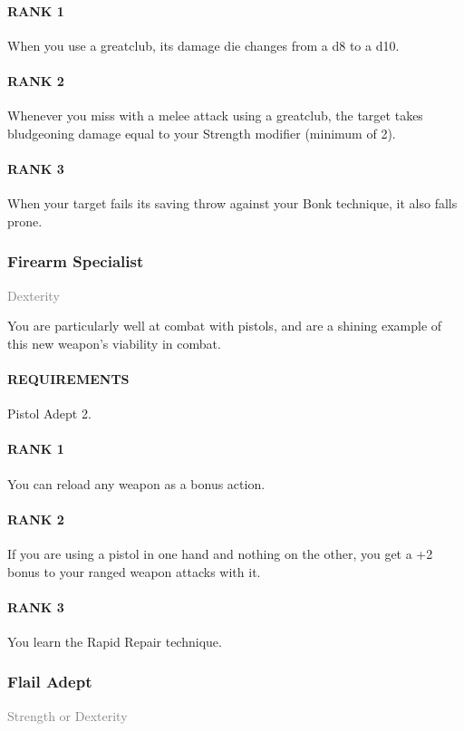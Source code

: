 \paragraph{RANK 1} When you use a greatclub, its damage die changes from a d8 to a d10.
\paragraph{RANK 2} Whenever you miss with a melee attack using a greatclub, the target takes bludgeoning damage equal to your Strength modifier (minimum of 2).
\paragraph{RANK 3} When your target fails its saving throw against your Bonk technique, it also falls prone.

\subsubsection{Firearm Specialist} \label{feat::firearmspecialist}
\small{\textcolor{gray}{Dexterity}}

\normalsize
You are particularly well at combat with pistols, and are a shining example of this new weapon's viability in combat.
\paragraph{REQUIREMENTS} Pistol Adept 2.
\paragraph{RANK 1} You can reload any weapon as a bonus action.
\paragraph{RANK 2} If you are using a pistol in one hand and nothing on the other, you get a +2 bonus to your ranged weapon attacks with it.
\paragraph{RANK 3} You learn the Rapid Repair technique.

\subsubsection{Flail Adept} \label{feat::flailadept}
\small{\textcolor{gray}{Strength or Dexterity}}


